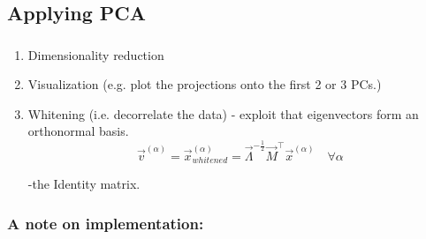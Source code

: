 \subsection{Applying PCA}



\begin{frame}\frametitle{\subsecname}

\begin{enumerate}
\item Dimensionality reduction
\item Visualization (e.g. plot the projections onto the first 2 or 3 PCs.)
\item Whitening (i.e. decorrelate the data) - exploit that eigenvectors form an orthonormal basis.
$$
\vec v^{(\alpha)} = \vec x_{whitened}^{(\alpha)} = \vec{\Lambda}^{-\frac{1}{2}}\vec{M}^\top\vec{x}^{(\alpha)}
\quad
\forall \alpha
$$


\pause

-the Identity matrix.

\end{enumerate}

\end{frame}

\newpage


\subsubsection{A note on implementation:}

